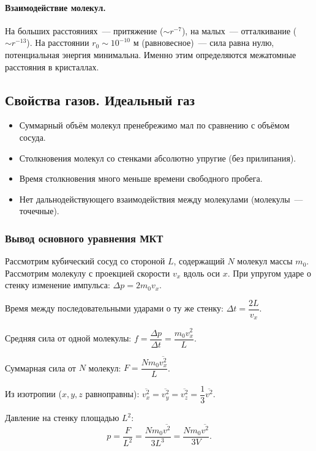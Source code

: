 \documentclass[12pt]{article}
\begin{document}
\paragraph{Взаимодействие молекул.}
На больших расстояниях~--- притяжение ($\sim r^{-7}$), на малых~--- отталкивание ($\sim r^{-13}$). На расстоянии $r_0 \sim 10^{-10}$ м (равновесное)~--- сила равна нулю, потенциальная энергия минимальна. Именно этим определяются межатомные расстояния в кристаллах.

\subsection{Свойства газов. Идеальный газ}

\begin{definition}
	\begin{itemize}
		\item Суммарный объём молекул пренебрежимо мал по сравнению с объёмом сосуда.
		\item Столкновения молекул со стенками абсолютно упругие (без прилипания).
		\item Время столкновения много меньше времени свободного пробега.
		\item Нет дальнодействующего взаимодействия между молекулами (молекулы~--- точечные).
	\end{itemize}
\end{definition}

\subsubsection{Вывод основного уравнения МКТ}

Рассмотрим кубический сосуд со стороной $L$, содержащий $N$ молекул массы $m_0$. Рассмотрим молекулу с проекцией скорости $v_x$ вдоль оси $x$. При упругом ударе о стенку изменение импульса: $\Delta p = 2m_0 v_x$.

Время между последовательными ударами о ту же стенку: $\Delta t = \dfrac{2L}{v_x}$.

Средняя сила от одной молекулы: $f = \dfrac{\Delta p}{\Delta t} = \dfrac{m_0 v_x^2}{L}$.

Суммарная сила от $N$ молекул: $F = \dfrac{N m_0 \overline{v_x^2}}{L}$.

Из изотропии ($x, y, z$ равноправны): $\overline{v_x^2} = \overline{v_y^2} = \overline{v_z^2} = \dfrac{1}{3}\overline{v^2}$.

Давление на стенку площадью $L^2$:
\[
	p = \frac{F}{L^2} = \frac{N m_0 \overline{v^2}}{3L^3} = \frac{N m_0 \overline{v^2}}{3V}.
\]
\end{document}
